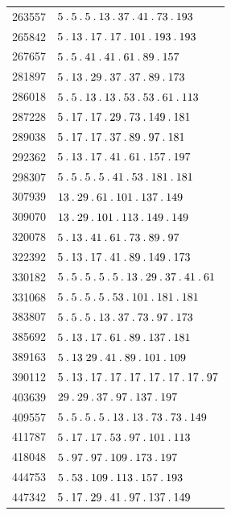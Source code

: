 \begin{longtable}{@{}r|l@{}}
263557 & $5\pdot 5\pdot 5\pdot 13\pdot 37\pdot 41\pdot 73\pdot 193$\\
265842 & $5\pdot 13\pdot 17\pdot 17\pdot 101\pdot 193\pdot 193$\\
267657 & $5\pdot 5\pdot 41\pdot 41\pdot 61\pdot 89\pdot 157$\\
281897 & $5\pdot 13\pdot 29\pdot 37\pdot 37\pdot 89\pdot 173$\\
286018 & $5\pdot 5\pdot 13\pdot 13\pdot 53\pdot 53\pdot 61\pdot 113$\\
287228 & $5\pdot 17\pdot 17\pdot 29\pdot 73\pdot 149\pdot 181$\\
289038 & $5\pdot 17\pdot 17\pdot 37\pdot 89\pdot 97\pdot 181$\\
292362 & $5\pdot 13\pdot 17\pdot 41\pdot 61\pdot 157\pdot 197$\\
298307 & $5\pdot 5\pdot 5\pdot 5\pdot 41\pdot 53\pdot 181\pdot 181$\\
307939 & $13\pdot 29\pdot 61\pdot 101\pdot 137\pdot 149$\\
309070 & $13\pdot 29\pdot 101\pdot 113\pdot 149\pdot 149$\\
320078 & $5\pdot 13\pdot 41\pdot 61\pdot 73\pdot 89\pdot 97$\\
322392 & $5\pdot 13\pdot 17\pdot 41\pdot 89\pdot 149\pdot 173$\\
330182 & $5\pdot 5\pdot 5\pdot 5\pdot 5\pdot 13\pdot 29\pdot 37\pdot 41\pdot 61$\\
331068 & $5\pdot 5\pdot 5\pdot 5\pdot 53\pdot 101\pdot 181\pdot 181$\\
383807 & $5\pdot 5\pdot 5\pdot 13\pdot 37\pdot 73\pdot 97\pdot 173$\\
385692 & $5\pdot 13\pdot 17\pdot 61\pdot 89\pdot 137\pdot 181$\\
389163 & $5\pdot 13\;29\pdot 41\pdot 89\pdot 101\pdot 109$\\
390112 & $5\pdot 13\pdot 17\pdot 17\pdot 17\pdot 17\pdot 17\pdot 17\pdot 97$\\
403639 & $29\pdot 29\pdot 37\pdot 97\pdot 137\pdot 197$\\
409557 & $5\pdot 5\pdot 5\pdot 5\pdot 13\pdot 13\pdot 73\pdot 73\pdot 149$\\
411787 & $5\pdot 17\pdot 17\pdot 53\pdot 97\pdot 101\pdot 113$\\
418048 & $5\pdot 97\pdot 97\pdot 109\pdot 173\pdot 197$\\
444753 & $5\pdot 53\pdot 109\pdot 113\pdot 157\pdot 193$\\
447342 & $5\pdot 17\pdot 29\pdot 41\pdot 97\pdot 137\pdot 149$\\

\end{longtable}
